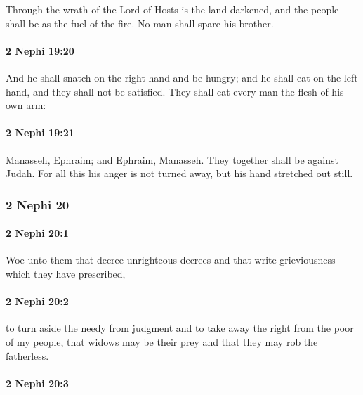 			Through the wrath of the Lord of Hosts is the land darkened,
			and the people shall be as the fuel of the fire.
			No man shall spare his brother.

		\paragraph{2 Nephi 19:20} %
			\label{2NEPHI-19-20}

			And he shall snatch on the right hand and be hungry;
			and he shall eat on the left hand, and they shall not be satisfied.
			They shall eat every man the flesh of his own arm:

		\paragraph{2 Nephi 19:21} %
			\label{2NEPHI-19-21}

			Manasseh, Ephraim; and Ephraim, Manasseh.
			They together shall be against Judah.
			For all this his anger is not turned away, but his hand stretched out still.

	\subsubsection{2 Nephi 20} %
		\label{2NEPHI-20}
		
		\paragraph{2 Nephi 20:1} %
			\label{2NEPHI-20-1}

			Woe unto them that decree unrighteous decrees
			and that write grieviousness which they have prescribed,

		\paragraph{2 Nephi 20:2} %
			\label{2NEPHI-20-2}

			to turn aside the needy from judgment
			and to take away the right from the poor of my people,
			that widows may be their prey and that they may rob the fatherless.

		\paragraph{2 Nephi 20:3} %
			\label{2NEPHI-20-3}

